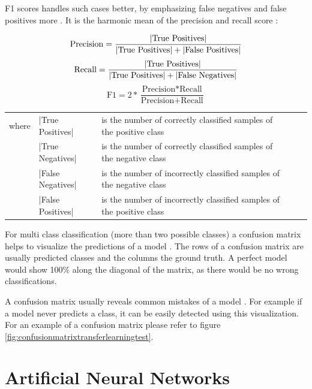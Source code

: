 \documentclass[draft,final,oneside]{vutinfth} %
\begin{document}
F1 scores handles such cases better, by emphasizing false negatives and false positives more \cite{Powers2008EvaluationFP}. It is the harmonic mean of the precision and recall score \cite{Powers2008EvaluationFP}:

\begin{equation}
\text{Precision}=\frac{|\text{True Positives}|} {|\text{True Positives}| + |\text{False Positives}|}\\
\end{equation}
\begin{equation}
\text{Recall}=\frac{|\text{True Positives}|} {|\text{True Positives}| + |\text{False Negatives}|}\\
\end{equation}
\begin{equation}
\text{F1} = 2 * \frac{\text{Precision} * \text{Recall}}{\text{Precision} + \text{Recall}}
\end{equation}
\FloatBarrier
\begin{table}[h]
\begin{tabular}{lllll}
where & |True Positives| & is the number of correctly classified samples of the positive class \\
 & |True Negatives| & is the number of correctly classified samples of the negative class \\
 & |False Negatives| & is the number of incorrectly classified samples of the negative class \\
 & |False Positives| & is the number of incorrectly classified samples of the positive class 
\end{tabular}
\end{table}
\FloatBarrier
For multi class classification (more than two possible classes) a confusion matrix helps to visualize the predictions of a model \cite{accuracy}. The rows of a confusion matrix are usually predicted classes and the columns the ground truth. A perfect model would show 100\% along the diagonal of the matrix, as there would be no wrong classifications.

A confusion matrix usually reveals common mistakes of a model \cite{accuracy}. For example if a model never predicts a class, it can be easily detected using this visualization. For an example of a confusion matrix please refer to figure \ref{fig:confusionmatrixtransferlearningtest}.

\section{Artificial Neural Networks}
\end{document}
